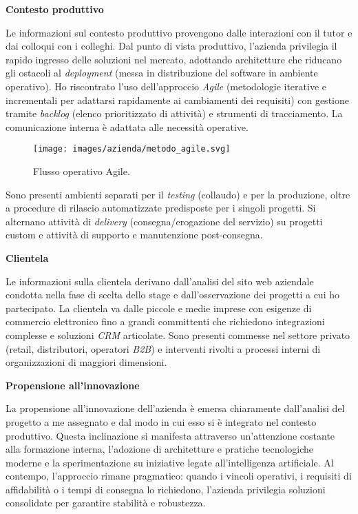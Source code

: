 \medskip
\noindent\textbf{Contesto produttivo}

Le informazioni sul contesto produttivo provengono dalle interazioni con il tutor e dai colloqui con i colleghi. 
Dal punto di vista produttivo, l'azienda privilegia il rapido ingresso delle soluzioni nel mercato, adottando architetture che riducano gli ostacoli al 
\emph{deployment} (messa in distribuzione del software in ambiente operativo). Ho riscontrato l'uso dell'approccio \emph{Agile} (metodologie iterative e incrementali per adattarsi rapidamente ai cambiamenti dei requisiti) 
con gestione tramite \emph{backlog} (elenco prioritizzato di attività) e strumenti di tracciamento. La comunicazione interna è adattata alle necessità operative.

\begin{figure}[htbp]
    \centering
    \texttt{[image: images/azienda/metodo\_agile.svg]}
    \caption{Flusso operativo Agile.}
    \label{fig:agile}
\end{figure}

Sono presenti ambienti separati per il \emph{testing} (collaudo) e per la produzione, oltre a procedure di rilascio automatizzate predisposte per i singoli progetti. 
Si alternano attività di \emph{delivery} (consegna/erogazione del servizio) su progetti custom e attività di supporto e manutenzione post-consegna.

\medskip
\noindent\textbf{Clientela}

Le informazioni sulla clientela derivano dall'analisi del sito web aziendale condotta nella fase di scelta dello stage e dall'osservazione dei progetti a cui ho partecipato. 
La clientela va dalle piccole e medie imprese con esigenze di commercio elettronico fino a grandi committenti che richiedono integrazioni complesse e soluzioni \emph{CRM} articolate. 
Sono presenti commesse nel settore privato (retail, distributori, operatori \emph{B2B}) e interventi rivolti a processi interni di organizzazioni di maggiori dimensioni.

\medskip
\noindent\textbf{Propensione all'innovazione}

La propensione all'innovazione dell'azienda è emersa chiaramente dall'analisi del progetto a me assegnato e dal modo in cui esso si è integrato nel contesto produttivo. 
Questa inclinazione si manifesta attraverso un'attenzione costante alla formazione interna, l'adozione di architetture e pratiche tecnologiche moderne e la sperimentazione su 
iniziative legate all'intelligenza artificiale. Al contempo, l'approccio rimane pragmatico: quando i vincoli operativi, i requisiti di affidabilità o i tempi di consegna lo richiedono, 
l'azienda privilegia soluzioni consolidate per garantire stabilità e robustezza.


